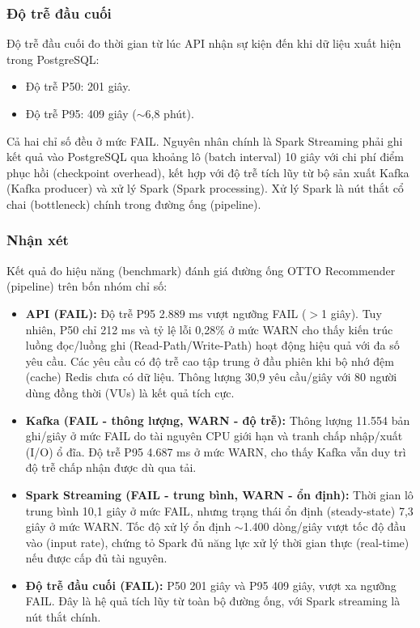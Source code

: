 \documentclass[../BTL.tex]{subfiles}
\begin{document}
\subsubsection{Độ trễ đầu cuối}
Độ trễ đầu cuối đo thời gian từ lúc API nhận sự kiện đến khi dữ liệu xuất hiện trong PostgreSQL:
\begin{itemize}
    \item Độ trễ P50: 201 giây.
    \item Độ trễ P95: 409 giây ($\sim$6,8 phút).
\end{itemize}
Cả hai chỉ số đều ở mức FAIL. Nguyên nhân chính là Spark Streaming phải ghi kết quả vào PostgreSQL qua khoảng lô (batch interval) 10 giây với chi phí điểm phục hồi (checkpoint overhead), kết hợp với độ trễ tích lũy từ bộ sản xuất Kafka (Kafka producer) và xử lý Spark (Spark processing). Xử lý Spark là nút thắt cổ chai (bottleneck) chính trong đường ống (pipeline).

\subsubsection{Nhận xét}
Kết quả đo hiệu năng (benchmark) đánh giá đường ống OTTO Recommender (pipeline) trên bốn nhóm chỉ số:

\begin{itemize}
    \item \textbf{API (FAIL):} Độ trễ P95 2.889 ms vượt ngưỡng FAIL ($>$1 giây). Tuy nhiên, P50 chỉ 212 ms và tỷ lệ lỗi 0,28\% ở mức WARN cho thấy kiến trúc luồng đọc/luồng ghi (Read-Path/Write-Path) hoạt động hiệu quả với đa số yêu cầu. Các yêu cầu có độ trễ cao tập trung ở đầu phiên khi bộ nhớ đệm (cache) Redis chưa có dữ liệu. Thông lượng 30,9 yêu cầu/giây với 80 người dùng đồng thời (VUs) là kết quả tích cực.

    \item \textbf{Kafka (FAIL - thông lượng, WARN - độ trễ):} Thông lượng 11.554 bản ghi/giây ở mức FAIL do tài nguyên CPU giới hạn và tranh chấp nhập/xuất (I/O) ổ đĩa. Độ trễ P95 4.687 ms ở mức WARN, cho thấy Kafka vẫn duy trì độ trễ chấp nhận được dù qua tải.

    \item \textbf{Spark Streaming (FAIL - trung bình, WARN - ổn định):} Thời gian lô trung bình 10,1 giây ở mức FAIL, nhưng trạng thái ổn định (steady-state) 7,3 giây ở mức WARN. Tốc độ xử lý ổn định $\sim$1.400 dòng/giây vượt tốc độ đầu vào (input rate), chứng tỏ Spark đủ năng lực xử lý thời gian thực (real-time) nếu được cấp đủ tài nguyên.

    \item \textbf{Độ trễ đầu cuối (FAIL):} P50 201 giây và P95 409 giây, vượt xa ngưỡng FAIL. Đây là hệ quả tích lũy từ toàn bộ đường ống, với Spark streaming là nút thắt chính.
\end{itemize}
\end{document}
